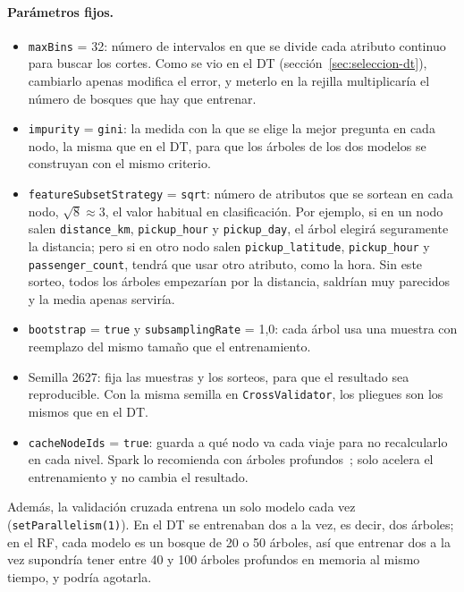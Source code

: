 \documentclass[12pt,a4paper]{article}
\begin{document}
\paragraph{Parámetros fijos.}
\begin{itemize}
    \item \texttt{maxBins} = 32: número de intervalos en que se divide cada
    atributo continuo para buscar los cortes. Como se vio en el \ac{DT}
    (sección~\ref{sec:seleccion-dt}), cambiarlo apenas modifica el error, y
    meterlo en la rejilla multiplicaría el número de bosques que hay que
    entrenar.
    \item \texttt{impurity} = \texttt{gini}: la medida con la que se elige
    la mejor pregunta en cada nodo, la misma que en el \ac{DT}, para que
    los árboles de los dos modelos se construyan con el mismo criterio.
    \item \texttt{featureSubsetStrategy} = \texttt{sqrt}: número de
    atributos que se sortean en cada nodo, $\sqrt{8} \approx 3$, el valor
    habitual en clasificación. Por ejemplo, si en un nodo salen
    \texttt{distance\_km}, \texttt{pickup\_hour} y \texttt{pickup\_day}, el
    árbol elegirá seguramente la distancia; pero si en otro nodo salen
    \texttt{pickup\_latitude}, \texttt{pickup\_hour} y
    \texttt{passenger\_count}, tendrá que usar otro atributo, como la hora.
    Sin este sorteo, todos los árboles empezarían por la distancia,
    saldrían muy parecidos y la media apenas serviría.
    \item \texttt{bootstrap} = \texttt{true} y \texttt{subsamplingRate} =
    1,0: cada árbol usa una muestra con reemplazo del mismo tamaño que el
    entrenamiento.
    \item Semilla 2627: fija las muestras y los sorteos, para que el
    resultado sea reproducible. Con la misma semilla en
    \texttt{CrossValidator}, los pliegues son los mismos que en el \ac{DT}.
    \item \texttt{cacheNodeIds} = \texttt{true}: guarda a qué nodo va cada
    viaje para no recalcularlo en cada nivel. Spark lo recomienda con
    árboles profundos~\cite{spark_mllib_dt}; solo acelera el entrenamiento y no
    cambia el resultado.
\end{itemize}
Además, la validación cruzada entrena un solo modelo cada vez
(\texttt{setParallelism(1)}). En el \ac{DT} se entrenaban dos a la vez, es
decir, dos árboles; en el \ac{RF}, cada modelo es un bosque de 20 o 50
árboles, así que entrenar dos a la vez supondría tener entre 40 y 100
árboles profundos en memoria al mismo tiempo, y podría agotarla.
\end{document}
